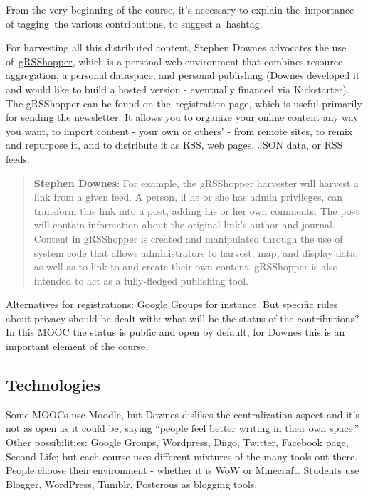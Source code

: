 From the very beginning of the course, it's necessary to explain
the~importance of tagging~the various contributions, to suggest
a~hashtag.

For harvesting all this distributed content, Stephen Downes advocates
the use of~\href{http://grsshopper.downes.ca/index.html}{gRSShopper},
which is a personal web environment that combines resource aggregation,
a personal dataspace, and personal publishing (Downes developed it and
would like to build a hosted version - eventually financed via
Kickstarter). The gRSShopper can be found on the~registration page,
which is useful primarily for sending the newsletter. It allows you to
organize your online content any way you want, to import content - your
own or others' - from remote sites, to remix and repurpose it, and to
distribute it as RSS, web pages, JSON data, or RSS feeds.

\begin{quote}
\textbf{Stephen Downes}: For example, the gRSShopper harvester will
harvest a link from a given feed. A person, if he or she has admin
privileges, can transform this link into a post, adding his or her own
comments. The post will contain information about the original link's
author and journal. Content in gRSShopper is created and manipulated
through the use of system code that allows administrators to harvest,
map, and display data, as well as to link to and create their own
content. gRSShopper is also intended to act as a fully-fledged
publishing tool.
\end{quote}

Alternatives for registrations: Google Groups for instance. But specific
rules about privacy should be dealt with: what will be the status of the
contributions? In this MOOC the status is public and open by default,
for Downes this is an important element of the course.

\hypertarget{technologies}{%
\subsection{Technologies}\label{technologies}}

Some MOOCs use Moodle, but Downes dislikes the centralization aspect and
it's not as open as it could be, saying ``people feel better writing in
their own space.'' Other possibilities: Google Groups, Wordpress, Diigo,
Twitter, Facebook page, Second Life; but each course uses different
mixtures of the many tools out there. People choose their environment -
whether it is WoW or Minecraft. Students use Blogger, WordPress, Tumblr,
Posterous as blogging tools.

